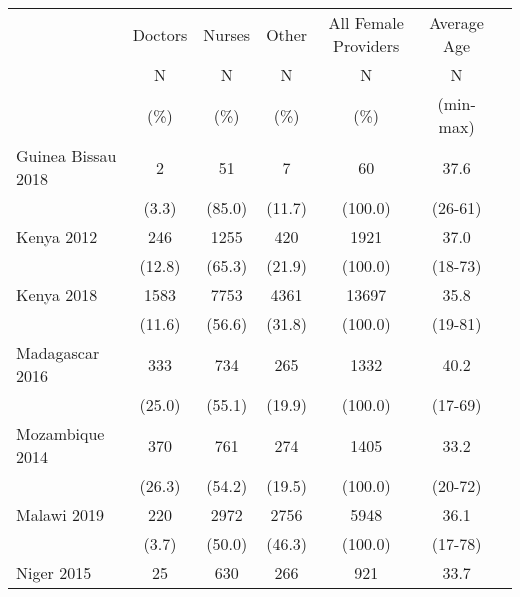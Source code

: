 \def\sym#1{\ifmmode^{#1}\else\(^{#1}\)\fi}
\begin{tabular}{l*{6}{c}}
\hline\hline
         &\multicolumn{1}{c}{Doctors}&\multicolumn{1}{c}{Nurses}&\multicolumn{1}{c}{Other}&\multicolumn{1}{c}{All Female Providers}&\multicolumn{1}{c}{Average Age}&\\
               &       N&                     N&       N&                       N&                         N\\
               &     (\%)&                 (\%)&    (\%)&                                      (\%)&                   (min-max)\\
\hline
Guinea Bissau 2018&            {2}&                {51}&           {7}&           {60}&         {37.6}\\
&                                              {(3.3)}&      {(85.0)}&             {(11.7)}&     {(100.0)}&       {(26-61)}\\
Kenya 2012&                            {246}&                {1255}&           {420}&       {1921}&         {37.0}\\
&                                              {(12.8)}&      {(65.3)}&             {(21.9)}&     {(100.0)}&       {(18-73)}\\
Kenya 2018&                    {1583}&                {7753}&           {4361}&       {13697}&         {35.8}\\
&                                              {(11.6)}&      {(56.6)}&             {(31.8)}&     {(100.0)}&       {(19-81)}\\
Madagascar 2016&               {333}&                {734}&           {265}&       {1332}&         {40.2}\\
&                                              {(25.0)}&      {(55.1)}&             {(19.9)}&     {(100.0)}&       {(17-69)}\\
Mozambique 2014&               {370}&                {761}&           {274}&       {1405}&         {33.2}\\
&                                              {(26.3)}&      {(54.2)}&             {(19.5)}&     {(100.0)}&       {(20-72)}\\
Malawi 2019&                   {220}&                {2972}&           {2756}&       {5948}&         {36.1}\\
&                                              {(3.7)}&      {(50.0)}&             {(46.3)}&     {(100.0)}&       {(17-78)}\\
Niger 2015&                    {25}&                {630}&           {266}&       {921}&         {33.7}\\

\end{tabular}
